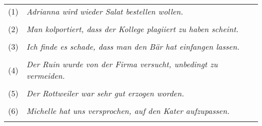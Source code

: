 \begin{spread}
  \begin{tabular}[h]{cl}
    (1) & \textit{Adrianna wird wieder Salat bestellen wollen.}\\
    &\\
    (2) & \textit{Man kolportiert, dass der Kollege plagiiert zu haben scheint.}\\
    &\\
    (3) & \textit{Ich finde es schade, dass man den Bär hat einfangen lassen.}\\
    &\\
    (4) & \textit{Der Ruin wurde von der Firma versucht, unbedingt zu vermeiden.}\\
    &\\
    (5) & \textit{Der Rottweiler war sehr gut erzogen worden.}\\
    &\\
    (6) & \textit{Michelle hat uns versprochen, auf den Kater aufzupassen.}\\
    &\\
  \end{tabular}
\end{spread}

